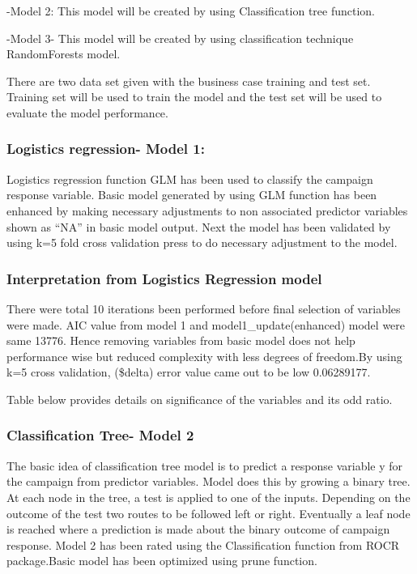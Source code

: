 \documentclass[english,floatsintext,man]{apa6}
\begin{document}
-Model 2: This model will be created by using Classification tree
function.

-Model 3- This model will be created by using classification technique
RandomForests model.

There are two data set given with the business case training and test
set. Training set will be used to train the model and the test set will
be used to evaluate the model performance.

\subsubsection{Logistics regression- Model
1:}\label{logistics-regression--model-1}

Logistics regression function GLM has been used to classify the campaign
response variable. Basic model generated by using GLM function has been
enhanced by making necessary adjustments to non associated predictor
variables shown as \enquote{NA} in basic model output. Next the model
has been validated by using k=5 fold cross validation press to do
necessary adjustment to the model.

\subsubsection{Interpretation from Logistics Regression
model}\label{interpretation-from-logistics-regression-model}

There were total 10 iterations been performed before final selection of
variables were made. AIC value from model 1 and model1\_update(enhanced)
model were same 13776. Hence removing variables from basic model does
not help performance wise but reduced complexity with less degrees of
freedom.By using k=5 cross validation, (\$delta) error value came out to
be low 0.06289177.

Table below provides details on significance of the variables and its
odd ratio.

\subsubsection{Classification Tree- Model
2}\label{classification-tree--model-2}

The basic idea of classification tree model is to predict a response
variable y for the campaign from predictor variables. Model does this by
growing a binary tree. At each node in the tree, a test is applied to
one of the inputs. Depending on the outcome of the test two routes to be
followed left or right. Eventually a leaf node is reached where a
prediction is made about the binary outcome of campaign response. Model
2 has been rated using the Classification function from ROCR
package.Basic model has been optimized using prune function.
\end{document}
